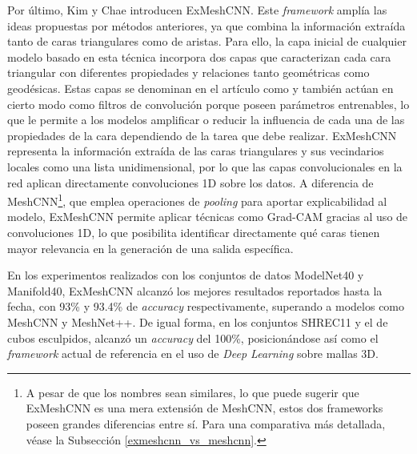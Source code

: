 Por último, Kim y Chae \cite{kim_exmeshcnn_2022} introducen ExMeshCNN. Este \textit{framework} amplía las ideas propuestas por métodos anteriores, ya que combina la información extraída tanto de caras triangulares como de aristas. Para ello, la capa inicial de cualquier modelo basado en esta técnica incorpora dos capas que caracterizan cada cara triangular con diferentes propiedades y relaciones tanto geométricas como geodésicas. Estas capas se denominan en el artículo como  y también actúan en cierto modo como filtros de convolución porque poseen parámetros entrenables, lo que le permite a los modelos amplificar o reducir la influencia de cada una de las propiedades de la cara dependiendo de la tarea que debe realizar. ExMeshCNN representa la información extraída de las caras triangulares y sus vecindarios locales como una lista unidimensional, por lo que las capas convolucionales en la red aplican directamente convoluciones 1D sobre los datos. A diferencia de MeshCNN\footnote{A pesar de que los nombres sean similares, lo que puede sugerir que ExMeshCNN es una mera extensión de MeshCNN, estos dos frameworks poseen grandes diferencias entre sí. Para una comparativa más detallada, véase la Subsección \ref{exmeshcnn_vs_meshcnn}.}, que emplea operaciones de \textit{pooling} para aportar explicabilidad al modelo, ExMeshCNN permite aplicar técnicas como Grad-CAM gracias al uso de convoluciones 1D, lo que posibilita identificar directamente qué caras tienen mayor relevancia en la generación de una salida específica.

En los experimentos realizados con los conjuntos de datos ModelNet40 y Manifold40, ExMeshCNN alcanzó los mejores resultados reportados hasta la fecha, con 93\% y 93.4\% de \textit{accuracy} respectivamente, superando a modelos como MeshCNN y MeshNet++. De igual forma, en los conjuntos SHREC11 y el de cubos esculpidos, alcanzó un \textit{accuracy} del 100\%, posicionándose así como el \textit{framework} actual de referencia en el uso de \textit{Deep Learning} sobre mallas 3D.